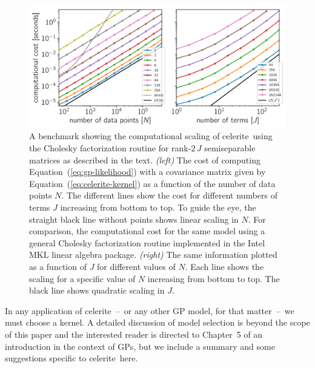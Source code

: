 \documentclass[manuscript, letterpaper]{aastex6}
\makeatletter
\let\origsubsection\subsection
\renewcommand\subsection{\@ifstar{\starsubsection}{\nostarsubsection}}
\newcommand\nostarsubsection[1]{\subsectionprelude\origsubsection{#1}}
\newcommand\starsubsection[1]{\subsectionprelude\origsubsection*{#1}}
\newcommand\subsectionprelude{\vspace{1em}}
\newcommand{\project}[1]{\textsf{#1}}
\newcommand{\celerite}{\project{celerite}}
\newcommand{\figurelabel}[1]{\label{fig:#1}}
\renewcommand{\eqref}[1]{\ref{eq:#1}}
\newcommand{\Eq}[1]{Equation~(\eqref{#1})}
\newcommand{\eq}[1]{\Eq{#1}}
\makeatother
\begin{document}
\begin{figure}[tp]
\begin{center}
\includegraphics[width=\textwidth]{figures/benchmark_darwin.pdf}
\caption{A benchmark showing the computational scaling of \celerite\ using the
    Cholesky factorization routine for rank-$2\,J$ semiseparable matrices as
    described in the text.
    \emph{(left)} The cost of computing \eq{gp-likelihood} with a covariance
    matrix given by \eq{celerite-kernel} as a function of the number of data
    points $N$.
    The different lines show the cost for different numbers of terms $J$
    increasing from bottom to top.
    To guide the eye, the straight black line without points
    shows linear scaling in $N$.
    For comparison, the computational cost for the same model using a general
    Cholesky factorization routine implemented in the Intel MKL linear algebra
    package.
    \emph{(right)} The same information plotted as a function of $J$ for
    different values of $N$.
    Each line shows the scaling for a specific value of $N$ increasing from
    bottom to top.
    The black line shows quadratic scaling in $J$.
    \figurelabel{benchmark}}
\end{center}
\end{figure}

\subsection{How to choose a celerite model}

In any application of \celerite~--~or any other GP model, for that
matter~--~we must choose a kernel.
A detailed discussion of model selection is beyond the scope of this paper and
the interested reader is directed to Chapter~5 of \citet{Rasmussen:2006} an
introduction in the context of GPs, but we include a summary and some
suggestions specific to \celerite\ here.
\end{document}
